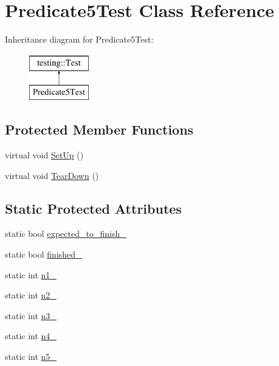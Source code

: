 \hypertarget{classPredicate5Test}{}\section{Predicate5\+Test Class Reference}
\label{classPredicate5Test}
Inheritance diagram for Predicate5\+Test\+:\begin{figure}[H]
\begin{center}
\leavevmode
\includegraphics[height=2.000000cm]{classPredicate5Test}
\end{center}
\end{figure}
\subsection*{Protected Member Functions}
\begin{DoxyCompactItemize}
\item 
virtual void \mbox{\hyperlink{classPredicate5Test_a42bf622b4f2134d0497cd42fd2e3e1df}{Set\+Up}} ()
\item 
virtual void \mbox{\hyperlink{classPredicate5Test_ab7bc4521d96174d5ef96156edc15444d}{Tear\+Down}} ()
\end{DoxyCompactItemize}
\subsection*{Static Protected Attributes}
\begin{DoxyCompactItemize}
\item 
static bool \mbox{\hyperlink{classPredicate5Test_aa502b7a330cc5c64785ff59aad3ef180}{expected\+\_\+to\+\_\+finish\+\_\+}}
\item 
static bool \mbox{\hyperlink{classPredicate5Test_a5003aada64accf06cdb28b1ff1797353}{finished\+\_\+}}
\item 
static int \mbox{\hyperlink{classPredicate5Test_a356c8e361185b234a417ed895eb14e38}{n1\+\_\+}}
\item 
static int \mbox{\hyperlink{classPredicate5Test_a5bf48ba65b7baf20abe1d2af90779ce0}{n2\+\_\+}}
\item 
static int \mbox{\hyperlink{classPredicate5Test_a63723efb915dbf418c31b97b64dabc0e}{n3\+\_\+}}
\item 
static int \mbox{\hyperlink{classPredicate5Test_a5d66aa58badddc8d3d8070a93c0558d6}{n4\+\_\+}}
\item 
static int \mbox{\hyperlink{classPredicate5Test_a96badba6366235a2771b27ea014bd9ce}{n5\+\_\+}}
\end{DoxyCompactItemize}
